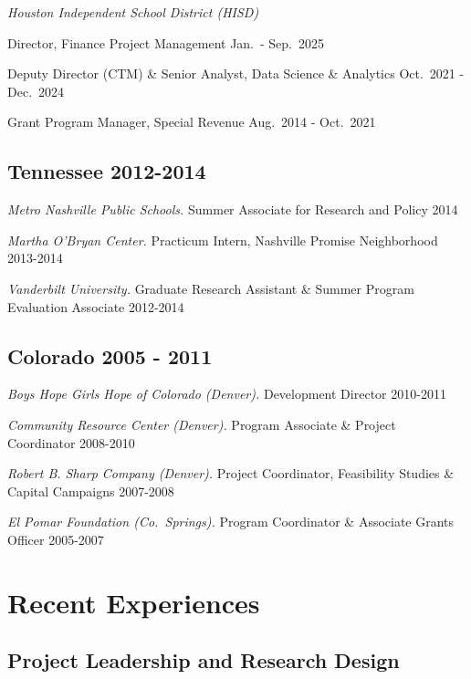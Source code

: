 \documentclass[
  11pt,
]
{article}
\begin{document}
\emph{Houston Independent School District (HISD)}

Director, Finance Project Management \hfill Jan.~- Sep.~2025

Deputy Director (CTM) \& Senior Analyst, Data Science \& Analytics
\hfill Oct.~2021 - Dec.~2024

Grant Program Manager, Special Revenue \hfill Aug.~2014 - Oct.~2021

\subsection{\texorpdfstring{\textbf{Tennessee
\hfill 2012-2014}}{Tennessee 2012-2014}}\label{tennessee-2012-2014}

\emph{Metro Nashville Public Schools.} Summer Associate for Research and
Policy \hfill 2014

\emph{Martha O'Bryan Center.} Practicum Intern, Nashville Promise
Neighborhood \hfill 2013-2014

\emph{Vanderbilt University.} Graduate Research Assistant \& Summer
Program Evaluation Associate \hfill 2012-2014

\subsection{\texorpdfstring{\textbf{Colorado \hfill 2005 -
2011}}{Colorado 2005 - 2011}}\label{colorado-2005---2011}

\emph{Boys Hope Girls Hope of Colorado (Denver).} Development Director
\hfill 2010-2011

\emph{Community Resource Center (Denver).} Program Associate \& Project
Coordinator \hfill 2008-2010

\emph{Robert B. Sharp Company (Denver).} Project Coordinator,
Feasibility Studies \& Capital Campaigns \hfill 2007-2008

\emph{El Pomar Foundation (Co.~Springs).} Program Coordinator \&
Associate Grants Officer \hfill 2005-2007

\section{Recent Experiences}\label{recent-experiences}

\subsection{\texorpdfstring{\textbf{Project Leadership and Research
Design}}{Project Leadership and Research Design}}\label{project-leadership-and-research-design}
\end{document}
